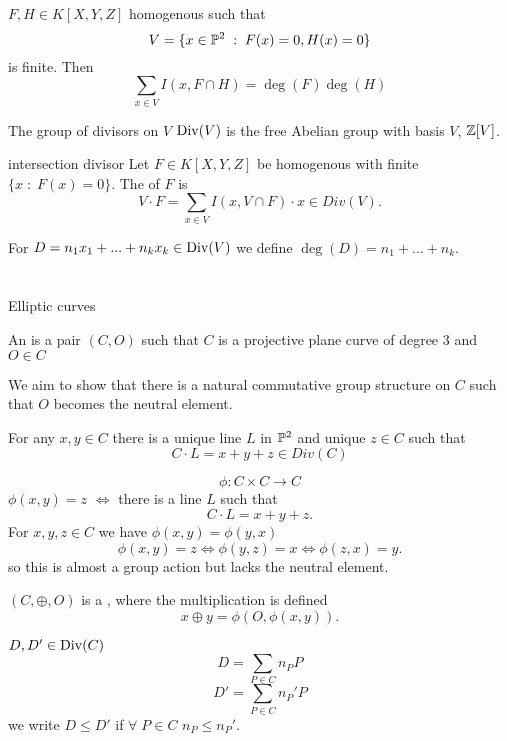 \documentclass[twoside, a4paper, 12pt]{book}
\begin{document}
\begin{theorem}{}{}
  $F,H\in K[X,Y,Z]$ homogenous such that 
  $$V=\{x\in \mathbb{P}^2\;:\;F(x)=0, H(x)=0\}$$
  is finite. Then
  $$\sum_{x\in V}I(x, F\cap H)=\deg(F)\deg(H)$$
\end{theorem}

The group of divisors on $V$ $\operatorname{Div}(V)$ is the free Abelian group with basis $V$, $\mathbb{Z}[V]$.
\begin{definition}{intersection divisor}{}
  Let $F\in K[X,Y,Z]$ be homogenous with finite $\{x\;:\;F(x)=0\}$. The  of $F$ is
  $$V\cdot F=\sum_{x\in V}I(x, V\cap F)\cdot x\in Div(V).$$
\end{definition}

For $D=n_1x_1+...+n_kx_k\in \operatorname{Div}(V)$ we define $\deg(D)=n_1+...+n_k$.

\section{}{Elliptic curves}

\begin{definition}{}{}
  An  is a pair $(C, O)$ such that $C$ is a projective plane curve of degree $3$ and $O\in C$
\end{definition}

We aim to show that there is a natural commutative group structure on $C$ such that $O$ becomes the neutral element.

\begin{lemma}{}{}
  For any $x,y\in C$ there is a unique line $L$ in $\mathbb{P}^2$ and unique $z\in C$ such that 
  $$C\cdot L=x+y+z\in Div(C)$$
\end{lemma}

$$\phi:C\times C\to C$$
$\phi(x, y)=z$ $\iff$ there is a line $L$ such that
$$C\cdot L=x+y+z.$$
For $x,y,z\in C$ we have $\phi(x,y)=\phi(y,x)$
$$\phi(x,y)=z\iff \phi(y,z)=x\iff \phi(z, x)=y.$$
so this is almost a group action but lacks the neutral element.

\begin{theorem}{}{}
  $(C, \oplus, O)$ is a , where the multiplication is defined
  $$x\oplus y=\phi(O, \phi(x,y)).$$
\end{theorem}

\begin{definition}{}{}
  $D,D'\in\operatorname{Div}(C)$
  $$D=\sum_{P\in C}n_PP$$
  $$D'=\sum_{P\in C}n_P'P$$
  we write $D\leq D'$ if $\forall\;P\in C$ $n_P\leq n_P'$.
\end{definition}
\end{document}

